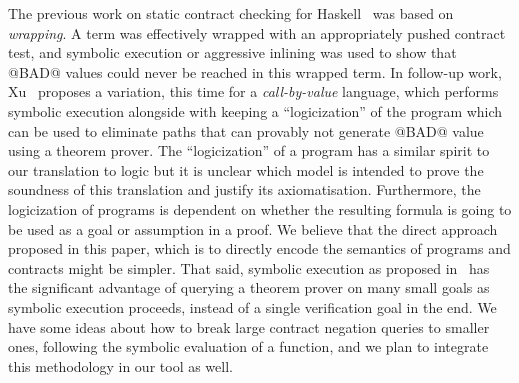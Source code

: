 The previous work on static contract checking for Haskell~\cite{xu+:contracts}
was based on {\em wrapping}. A term was effectively wrapped
with an appropriately pushed contract test, and symbolic execution or aggressive inlining was used to show that @BAD@ values could
never be reached in this wrapped term.
In follow-up work, Xu~\cite{Xu:2012:HCC:2103746.2103767} proposes a variation, this time for a
{\em call-by-value} language, which performs symbolic execution alongside with
keeping a ``logicization'' of the program which can be used to eliminate paths that can
provably not generate @BAD@ value using a theorem prover. The ``logicization'' of a
program has a similar spirit to our translation to logic but it is
unclear which model is intended to prove the soundness of this translation
and justify its axiomatisation.
Furthermore, the logicization of programs is dependent on whether
the resulting formula is going to be used as a goal or assumption in a proof. We believe
that the direct approach proposed in this paper, which is to directly encode the semantics
of programs and contracts might be simpler. That said, symbolic execution as proposed
in~\cite{Xu:2012:HCC:2103746.2103767} has the significant advantage of querying a
theorem prover on many small goals as symbolic execution proceeds, instead of a
single verification goal in the end. We have some ideas about how to break large
contract negation queries to smaller ones, following the symbolic evaluation of
a function, and we plan to integrate this methodology in our tool as well.

